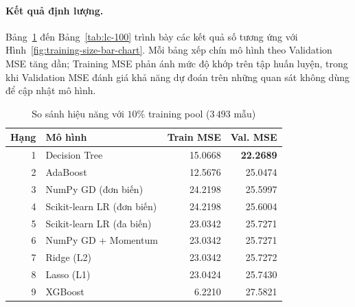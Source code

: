 \paragraph{Kết quả định lượng.}

Bảng~\ref{tab:lc-10} đến Bảng~\ref{tab:lc-100} trình bày
các kết quả số tương ứng với Hình~\ref{fig:training-size-bar-chart}.
Mỗi bảng xếp chín mô hình theo Validation MSE tăng dần;
Training MSE phản ánh mức độ khớp trên tập huấn luyện,
trong khi Validation MSE đánh giá khả năng dự đoán trên
những quan sát không dùng để cập nhật mô hình.


\begin{table}[H]
    \centering
    \caption{So sánh hiệu năng với $10\%$ training pool ($3\,493$ mẫu)}
    \label{tab:lc-10}
    \small
    \begin{tabular}{r p{} rr}
        \toprule
        \textbf{Hạng} & \textbf{Mô hình} & \textbf{Train MSE}
        & \textbf{Val. MSE} \\
        \midrule
        1 & Decision Tree & 15.0668 & \textbf{22.2689} \\
        2 & AdaBoost & 12.5676 & 25.0474 \\
        3 & NumPy GD (đơn biến) & 24.2198 & 25.5997 \\
        4 & Scikit-learn LR (đơn biến) & 24.2198 & 25.6004 \\
        5 & Scikit-learn LR (đa biến) & 23.0342 & 25.7271 \\
        6 & NumPy GD + Momentum & 23.0342 & 25.7271 \\
        7 & Ridge (L2) & 23.0342 & 25.7272 \\
        8 & Lasso (L1) & 23.0424 & 25.7430 \\
        9 & XGBoost & 6.2210 & 27.5821 \\
        \bottomrule
    \end{tabular}
\end{table}


